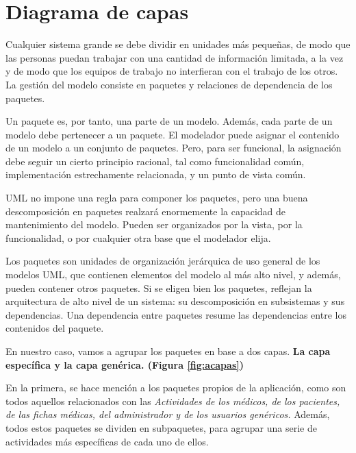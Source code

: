 \documentclass[a4paper,oneside,11pt]{book}
\begin{document}
	

	\newpage
	\section{Diagrama de capas} %
	\label{sec:diagrama_de_capas}
	
		Cualquier sistema grande se debe dividir en unidades más pequeñas, de modo que las personas puedan trabajar con una cantidad de información limitada, a la vez y de modo que los equipos de trabajo no interfieran con el trabajo de los otros. La gestión del modelo consiste en paquetes y relaciones de dependencia de los paquetes.
		
		Un paquete es, por tanto, una parte de un modelo. Además, cada parte de un modelo debe pertenecer a un paquete. El modelador puede asignar el contenido de un modelo a un conjunto de paquetes. Pero, para ser funcional, la asignación debe seguir un cierto principio racional, tal como funcionalidad común, implementación estrechamente relacionada, y un punto de vista común.
		
		UML no impone una regla para componer los paquetes, pero una buena descomposición en paquetes realzará enormemente la capacidad de mantenimiento del modelo. Pueden ser organizados por la vista, por la funcionalidad, o por cualquier otra base que el modelador elija.
		
		Los paquetes son unidades de organización jerárquica de uso general de los modelos UML, que contienen elementos del modelo al más alto nivel, y además, pueden contener otros paquetes. Si se eligen bien los paquetes, reflejan la arquitectura de alto nivel de un sistema: su descomposición en subsistemas y sus dependencias. Una dependencia entre paquetes resume las dependencias entre los contenidos del paquete.
		
		En nuestro caso, vamos a agrupar los paquetes en base a dos capas. \textbf{La capa específica y la capa genérica. (Figura \ref{fig:acapas})} 
		
		En la primera, se hace mención a los paquetes propios de la aplicación, como son todos aquellos relacionados con las \textit{Actividades de los médicos, de los pacientes, de las fichas médicas, del administrador y de los usuarios genéricos.} Además, todos estos paquetes se dividen en subpaquetes, para agrupar una serie de actividades más específicas de cada uno de ellos. 
		
\end{document}
